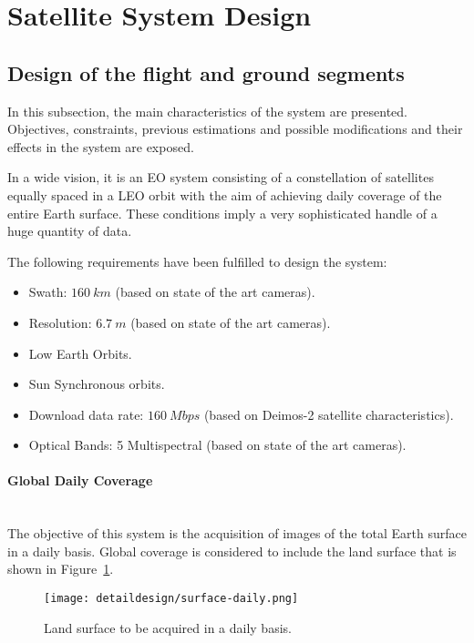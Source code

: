
\section{Satellite System Design}
\label{subsec:system-design}
\subsection{Design of the flight and ground segments}
\label{subsubsec:design-flight-ground}
In this subsection, the main characteristics of the system are presented. Objectives, constraints, previous estimations and possible modifications and their effects in the system are exposed.

In a wide vision, it is an \ac{EO} system consisting of a constellation of satellites equally spaced in a \ac{LEO} orbit with the aim of achieving daily coverage of the entire Earth surface. These conditions imply a very sophisticated handle of a huge quantity of data.

The following requirements have been fulfilled to design the system:
\begin{itemize}
\item Swath: $160~km$ (based on state of the art cameras).
\item Resolution: $6.7~m$ (based on state of the art cameras).
\item Low Earth Orbits.
\item Sun Synchronous orbits.
\item Download data rate: $160~Mbps$ (based on Deimos-2 satellite characteristics).
\item Optical Bands: 5 Multispectral (based on state of the art cameras).
\end{itemize}

\paragraph{Global Daily Coverage}~\\
The objective of this system is the acquisition of images of the total Earth surface in a daily basis. Global coverage is considered to include the land surface that is shown in Figure~\ref{fig:intr-land-surface}.


\begin{figure}[!h]
\begin{center}
\texttt{[image: detaildesign/surface-daily.png]}
\caption{Land surface to be acquired in a daily basis.}
\label{fig:intr-land-surface}
\end{center}
\end{figure}


